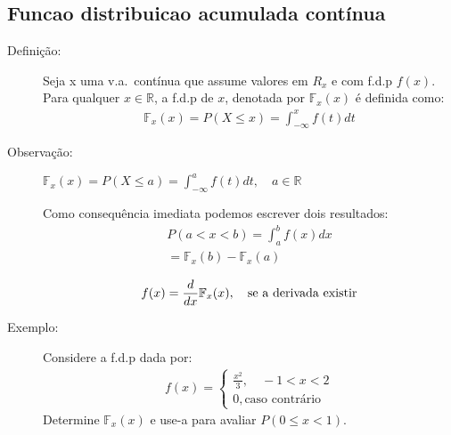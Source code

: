 \documentclass[11pt,a4paper]{book}
\begin{document}
 \subsection{Funcao distribuicao acumulada contínua}
 \begin{description}
   \item [Definição:] Seja x uma v.a.\ contínua que assume valores em $R_{x}$ e com 
     f.d.p $f(x)$. Para qualquer $x \in \mathbb{R}$, a f.d.p de $x$, denotada por 
     $\mathbb{F}_{x}(x)$ é definida como: 
     \begin{align}
       \mathbb{F}_{x}(x)= P(X \le x)= \int_{- \infty}^{x} f(t)dt 
     \end{align}
   \item [Observação:] $\mathbb{F}_{x}(x)= P(X \le a)= \int_{-\infty}^{a} f(t)dt , \quad a \in \mathbb{R}$

     Como consequência imediata podemos escrever dois resultados: 
     \begin{align}
       P(a <x<b)= \int_{a}^{b} f(x)dx\\
       = \mathbb{F}_{x}(b)-\mathbb{F}_{x}(a)
     \end{align}

     \begin{align}
       f(x)=\frac{d}{dx}\mathbb{F}_{x}(x), \text{\quad se a derivada existir}
     \end{align}

   \item [ Exemplo: ] Considere a f.d.p dada por: 
     \begin{align*}
       f(x)= 
       \begin{cases}
         \frac{x^2}{3},\quad  -1 < x < 2 \\
         0, \text{caso contrário}
       \end{cases}
     \end{align*}
     Determine $\mathbb{F}_{x}(x)$ e use-a para avaliar $P(0 \le x< 1)$.


\end{description}
\end{document}
